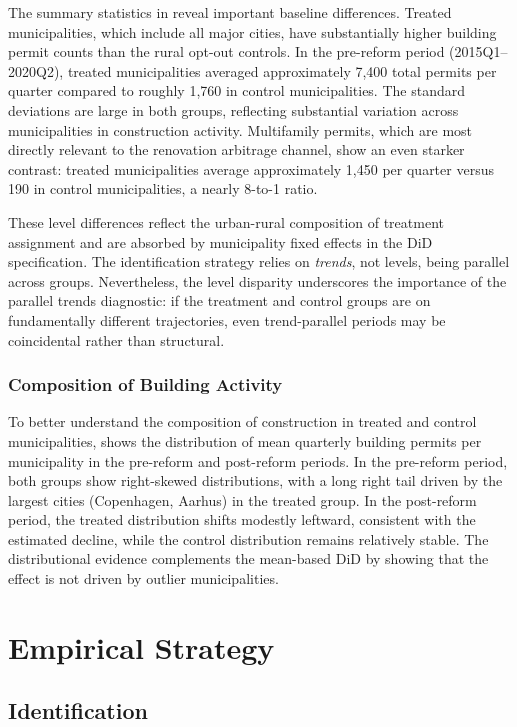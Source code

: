\documentclass[12pt]{article}
\begin{document}
The summary statistics in  reveal important baseline differences. Treated municipalities, which include all major cities, have substantially higher building permit counts than the rural opt-out controls. In the pre-reform period (2015Q1--2020Q2), treated municipalities averaged approximately 7,400 total permits per quarter compared to roughly 1,760 in control municipalities. The standard deviations are large in both groups, reflecting substantial variation across municipalities in construction activity. Multifamily permits, which are most directly relevant to the renovation arbitrage channel, show an even starker contrast: treated municipalities average approximately 1,450 per quarter versus 190 in control municipalities, a nearly 8-to-1 ratio.

These level differences reflect the urban-rural composition of treatment assignment and are absorbed by municipality fixed effects in the DiD specification. The identification strategy relies on \emph{trends}, not levels, being parallel across groups. Nevertheless, the level disparity underscores the importance of the parallel trends diagnostic: if the treatment and control groups are on fundamentally different trajectories, even trend-parallel periods may be coincidental rather than structural.

\subsubsection*{Composition of Building Activity} To better understand the composition of construction in treated and control municipalities,  shows the distribution of mean quarterly building permits per municipality in the pre-reform and post-reform periods. In the pre-reform period, both groups show right-skewed distributions, with a long right tail driven by the largest cities (Copenhagen, Aarhus) in the treated group. In the post-reform period, the treated distribution shifts modestly leftward, consistent with the estimated decline, while the control distribution remains relatively stable. The distributional evidence complements the mean-based DiD by showing that the effect is not driven by outlier municipalities.

\section{Empirical Strategy}

\subsection{Identification}
\end{document}
